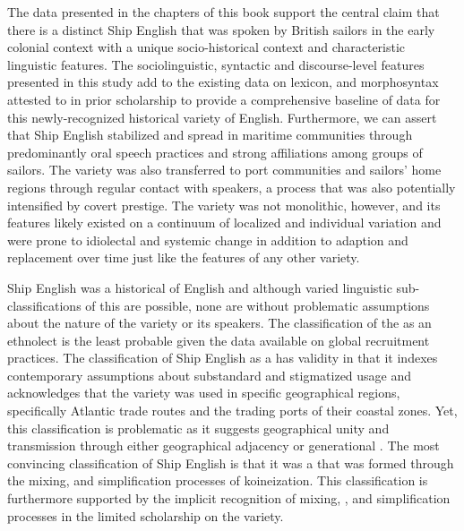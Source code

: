 The data presented in the chapters of this book support the central claim that there is a distinct Ship English that was spoken by British sailors in the early colonial context with a unique socio-historical context and characteristic linguistic features. The sociolinguistic, syntactic and discourse-level features presented in this study add to the existing data on lexicon,  and morphosyntax attested to in prior scholarship to provide a comprehensive baseline of data for this newly-recognized historical variety of English. Furthermore, we can assert that Ship English stabilized and spread in maritime communities through predominantly oral speech practices and strong affiliations among groups of sailors. The variety was also transferred to port communities and sailors’ home regions through regular contact with speakers, a process that was also potentially intensified by covert prestige. The variety was not monolithic, however, and its features likely existed on a continuum of localized and individual variation and were prone to idiolectal and systemic change in addition to adaption and replacement over time just like the features of any other variety. 

Ship English was a historical  of English and although varied linguistic sub-classifications of this  are possible, none are without problematic assumptions about the nature of the variety or its speakers. The classification of the  as an ethnolect is the least probable given the data available on global recruitment practices. The classification of Ship English as a  has validity in that it indexes contemporary assumptions about {substandard and stigmatized usage and acknowledges that the variety was used in specific geographical regions, specifically Atlantic trade routes} and the trading ports of their coastal zones. {Yet, this classification} is problematic{ as it suggests} geographical unity and transmission through either geographical adjacency or generational . The most convincing classification of Ship English is that it was a  that was formed through the mixing,  and simplification processes of koineization. This classification is furthermore supported by the implicit recognition of mixing, , and simplification processes in the limited scholarship on the variety.

